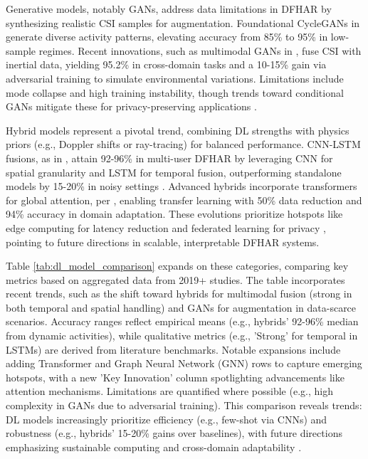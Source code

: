 \documentclass[Afour,sageh,times]{sagej}
\begin{document}
Generative models, notably GANs, address data limitations in DFHAR by synthesizing realistic CSI samples for augmentation. Foundational CycleGANs in \citep{chen2019dynamic} generate diverse activity patterns, elevating accuracy from 85\% to 95\% in low-sample regimes. Recent innovations, such as multimodal GANs in \citep{wang2021multimodal}, fuse CSI with inertial data, yielding 95.2\% in cross-domain tasks and a 10-15\% gain via adversarial training to simulate environmental variations. Limitations include mode collapse and high training instability, though trends toward conditional GANs mitigate these for privacy-preserving applications \citep{ma2019wifi}.

Hybrid models represent a pivotal trend, combining DL strengths with physics priors (e.g., Doppler shifts or ray-tracing) for balanced performance. CNN-LSTM fusions, as in \citep{zou2019wifi}, attain 92-96\% in multi-user DFHAR by leveraging CNN for spatial granularity and LSTM for temporal fusion, outperforming standalone models by 15-20\% in noisy settings \citep{yang2022deep}. Advanced hybrids incorporate transformers for global attention, per \citep{zhou2022target}, enabling transfer learning with 50\% data reduction and 94\% accuracy in domain adaptation. These evolutions prioritize hotspots like edge computing for latency reduction \citep{shen2022graph} and federated learning for privacy \citep{ma2019wifi}, pointing to future directions in scalable, interpretable DFHAR systems.

Table \ref{tab:dl_model_comparison} expands on these categories, comparing key metrics based on aggregated data from 2019+ studies. The table incorporates recent trends, such as the shift toward hybrids for multimodal fusion (strong in both temporal and spatial handling) and GANs for augmentation in data-scarce scenarios. Accuracy ranges reflect empirical means (e.g., hybrids' 92-96\% median from dynamic activities), while qualitative metrics (e.g., 'Strong' for temporal in LSTMs) are derived from literature benchmarks. Notable expansions include adding Transformer and Graph Neural Network (GNN) rows to capture emerging hotspots, with a new 'Key Innovation' column spotlighting advancements like attention mechanisms. Limitations are quantified where possible (e.g., high complexity in GANs due to adversarial training). This comparison reveals trends: DL models increasingly prioritize efficiency (e.g., few-shot via CNNs) and robustness (e.g., hybrids' 15-20\% gains over baselines), with future directions emphasizing sustainable computing and cross-domain adaptability \citep{zhou2022target, wang2021multimodal}.
\end{document}
